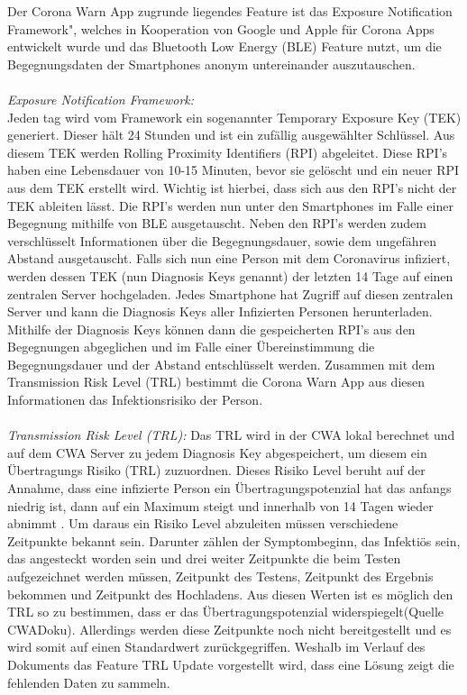 \documentclass[conference]{IEEEtran}
\begin{document}
Der Corona Warn App zugrunde liegendes Feature ist das \glqq Exposure Notification Framework", 
welches in Kooperation von Google und Apple für Corona Apps entwickelt wurde und das Bluetooth Low Energy (BLE) Feature nutzt, 
um die Begegnungsdaten der Smartphones anonym untereinander auszutauschen. \\
\\
\textit{Exposure Notification Framework:}\\
Jeden tag wird vom Framework ein sogenannter Temporary Exposure Key (TEK) generiert. Dieser hält 24 Stunden und ist ein zufällig ausgewählter Schlüssel. 
Aus diesem TEK werden Rolling Proximity Identifiers (RPI) abgeleitet. 
Diese RPI's haben eine Lebensdauer von 10-15 Minuten, bevor sie gelöscht und ein neuer RPI aus dem TEK erstellt wird. Wichtig ist hierbei, 
dass sich aus den RPI's nicht der TEK ableiten lässt. 
Die RPI's werden nun unter den Smartphones im Falle einer Begegnung mithilfe von BLE ausgetauscht. Neben den RPI's werden zudem verschlüsselt Informationen über die Begegnungsdauer, sowie dem ungefähren Abstand ausgetauscht.
Falls sich nun eine Person mit dem Coronavirus infiziert, werden dessen TEK (nun Diagnosis Keys genannt) der letzten 14 Tage auf einen zentralen Server hochgeladen. 
Jedes Smartphone hat Zugriff auf diesen zentralen Server und kann die Diagnosis Keys aller Infizierten Personen  herunterladen. 
Mithilfe der Diagnosis Keys können dann die gespeicherten RPI's aus den Begegnungen abgeglichen und im Falle einer Übereinstimmung die Begegnungsdauer und der Abstand entschlüsselt werden. 
Zusammen mit dem Transmission Risk Level (TRL) bestimmt die Corona Warn App aus diesen Informationen das Infektionsrisiko der Person. \\
\\
\textit{Transmission Risk Level (TRL):}
Das TRL wird in der CWA lokal berechnet und auf dem CWA Server zu jedem Diagnosis Key abgespeichert, um diesem ein Übertragungs Risiko (TRL) zuzuordnen. 
Dieses Risiko Level beruht auf der Annahme, dass eine infizierte Person ein Übertragungspotenzial hat das anfangs niedrig ist, 
dann auf ein Maximum steigt und innerhalb von 14 Tagen wieder abnimmt . Um daraus ein Risiko Level abzuleiten müssen verschiedene Zeitpunkte bekannt sein. 
Darunter zählen der Symptombeginn, das Infektiös sein, das angesteckt worden sein und drei weiter Zeitpunkte die beim Testen aufgezeichnet werden müssen, 
Zeitpunkt des Testens, Zeitpunkt des Ergebnis bekommen und Zeitpunkt des Hochladens. Aus diesen Werten ist es möglich den TRL so zu bestimmen, 
dass er das Übertragungspotenzial widerspiegelt(Quelle CWADoku).
Allerdings werden diese Zeitpunkte noch nicht bereitgestellt und es wird somit auf einen Standardwert zurückgegriffen. 
Weshalb im Verlauf des Dokuments das Feature TRL Update vorgestellt wird, dass eine Lösung zeigt die fehlenden Daten zu sammeln.
\end{document}
